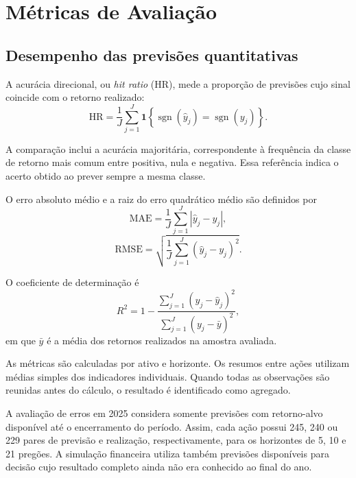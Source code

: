 \section{Métricas de Avaliação}
\label{sec:metricas_experimentais}

\subsection{Desempenho das previsões quantitativas}
\label{sec:desempenho_das_previsoes_quantitativas}

A acurácia direcional, ou \emph{hit ratio} (HR),
mede a proporção de previsões cujo sinal coincide
com o retorno realizado:
\begin{equation}
\mathrm{HR}
=
\frac{1}{J}
\sum_{j=1}^{J}
\mathbf{1}
\left\{
\operatorname{sgn}(\widehat{y}_j)
=
\operatorname{sgn}(y_j)
\right\}.
\label{eq:hr_cap4}
\end{equation}

A comparação inclui a acurácia majoritária,
correspondente à frequência da classe de retorno
mais comum entre positiva, nula e negativa.
Essa referência indica o acerto obtido ao prever
sempre a mesma classe.

O erro absoluto médio e a raiz do erro quadrático
médio são definidos por
\begin{equation}
\mathrm{MAE}
=
\frac{1}{J}
\sum_{j=1}^{J}
|\widehat{y}_j-y_j|,
\label{eq:mae_cap4}
\end{equation}
\begin{equation}
\mathrm{RMSE}
=
\sqrt{
\frac{1}{J}
\sum_{j=1}^{J}
(\widehat{y}_j-y_j)^2
}.
\label{eq:rmse_cap4}
\end{equation}

O coeficiente de determinação é
\begin{equation}
R^2
=
1-
\frac{
\sum_{j=1}^{J}(y_j-\widehat{y}_j)^2
}{
\sum_{j=1}^{J}(y_j-\bar{y})^2
},
\label{eq:r2_cap4}
\end{equation}
em que $\bar{y}$ é a média dos retornos realizados
na amostra avaliada.

As métricas são calculadas por ativo e horizonte.
Os resumos entre ações utilizam médias simples
dos indicadores individuais. Quando todas as
observações são reunidas antes do cálculo,
o resultado é identificado como agregado.

A avaliação de erros em 2025 considera somente
previsões com retorno-alvo disponível até o
encerramento do período. Assim, cada ação possui
245, 240 ou 229 pares de previsão e realização,
respectivamente, para os horizontes de 5, 10
e 21 pregões. A simulação financeira utiliza
também previsões disponíveis para decisão cujo
resultado completo ainda não era conhecido
ao final do ano.

